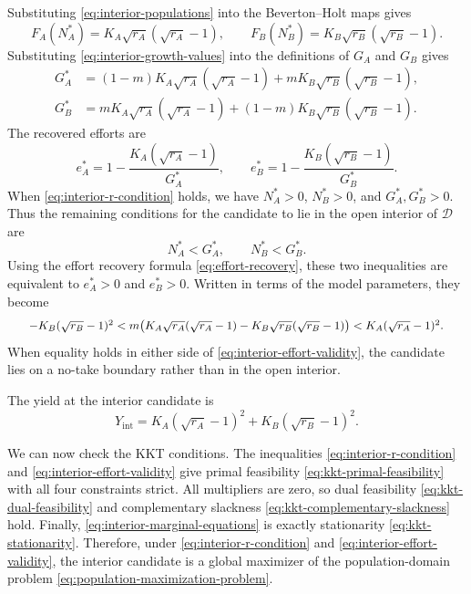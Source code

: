 \documentclass{article}
\numberwithin{equation}{section}
\begin{document}
Substituting \eqref{eq:interior-populations} into the
Beverton--Holt maps gives
\begin{equation}
    \label{eq:interior-growth-values}
    F_A(N_A^*)=K_A\sqrt{r_A}(\sqrt{r_A}-1),
    \qquad
    F_B(N_B^*)=K_B\sqrt{r_B}(\sqrt{r_B}-1).
\end{equation}
Substituting \eqref{eq:interior-growth-values} into the definitions
of $G_A$ and $G_B$ gives
\begin{equation}
    \label{eq:interior-g-star}
    \begin{aligned}
    G_A^*
    &=
    (1-m)K_A\sqrt{r_A}(\sqrt{r_A}-1)
    +mK_B\sqrt{r_B}(\sqrt{r_B}-1),\\
    G_B^*
    &=
    mK_A\sqrt{r_A}(\sqrt{r_A}-1)
    +(1-m)K_B\sqrt{r_B}(\sqrt{r_B}-1).
    \end{aligned}
\end{equation}
The recovered efforts are
\begin{equation}
    \label{eq:interior-efforts}
    e_A^*
    =
    1-\frac{K_A(\sqrt{r_A}-1)}{G_A^*},
    \qquad
    e_B^*
    =
    1-\frac{K_B(\sqrt{r_B}-1)}{G_B^*}.
\end{equation}
When \eqref{eq:interior-r-condition} holds, we have
$N_A^*>0$, $N_B^*>0$, and $G_A^*,G_B^*>0$. Thus the remaining
conditions for the candidate to lie in the open interior of
$\mathcal D$ are
\begin{equation*}
    N_A^*<G_A^*,
    \qquad
    N_B^*<G_B^*.
\end{equation*}
Using the effort recovery formula \eqref{eq:effort-recovery}, these
two inequalities are equivalent to $e_A^*>0$ and $e_B^*>0$. Written in
terms of the model parameters, they become
\begin{equation}
    \label{eq:interior-effort-validity}
    \scalebox{0.92}{$
    -K_B(\sqrt{r_B}-1)^2
    <
    m\bigl(K_A\sqrt{r_A}(\sqrt{r_A}-1)
    -K_B\sqrt{r_B}(\sqrt{r_B}-1)\bigr)
    <
    K_A(\sqrt{r_A}-1)^2.
    $}
\end{equation}
When equality holds in either side of
\eqref{eq:interior-effort-validity}, the candidate lies on a
no-take boundary rather than in the open interior.

The yield at the interior candidate is
\begin{equation}
    \label{eq:interior-yield}
    Y_{\mathrm{int}}
    =
    K_A(\sqrt{r_A}-1)^2
    +
    K_B(\sqrt{r_B}-1)^2.
\end{equation}

We can now check the KKT conditions. The inequalities
\eqref{eq:interior-r-condition} and
\eqref{eq:interior-effort-validity} give primal feasibility
\eqref{eq:kkt-primal-feasibility} with all four constraints strict.
All multipliers are zero, so dual feasibility
\eqref{eq:kkt-dual-feasibility} and complementary slackness
\eqref{eq:kkt-complementary-slackness} hold. Finally,
\eqref{eq:interior-marginal-equations} is exactly stationarity
\eqref{eq:kkt-stationarity}. Therefore, under
\eqref{eq:interior-r-condition} and
\eqref{eq:interior-effort-validity}, the interior candidate is a
global maximizer of the population-domain problem
\eqref{eq:population-maximization-problem}.
\end{document}
